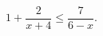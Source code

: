\begin{ex}[type=inequality]
	\begin{condition}
		$1 +  \dfrac{2}{x + 4} \leqslant \dfrac{7}{6 - x} .$
	\end{condition}
\end{ex}